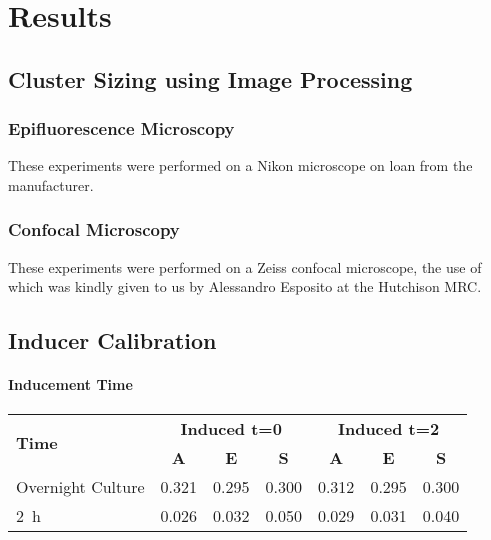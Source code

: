 \documentclass[../main.tex]{subfiles}
\begin{document}
\section{Results}

\subsection{Cluster Sizing using Image Processing}

\subsubsection{Epifluorescence Microscopy}

These experiments were performed on a Nikon microscope on loan from the manufacturer.

\subsubsection{Confocal Microscopy}

These experiments were performed on a Zeiss confocal microscope, the use of which was kindly given to us by Alessandro Esposito at the Hutchison MRC.




\subsection{Inducer Calibration}

\paragraph{Inducement Time}

\begin{table}[h!]
\begin{center}
\begin{tabular}{l|c|c|c|c|c|c}
\multirow{2}{*}{\textbf{Time}} &	\multicolumn{3}{c|}{\textbf{Induced t=0}}  &	\multicolumn{3}{c}{\textbf{Induced t=2}}	\\
& \textbf{A} & \textbf{E} & \textbf{S} & \textbf{A} & \textbf{E} & \textbf{S} \\\hline
Overnight Culture & 0.321 & 0.295 & 0.300 & 0.312 & 0.295 & 0.300\\
\SI{2}{\hour} & 0.026 & 0.032 & 0.050 & 0.029 & 0.031 & 0.040
\end{tabular}
\end{center}
\end{table}
\end{document}
